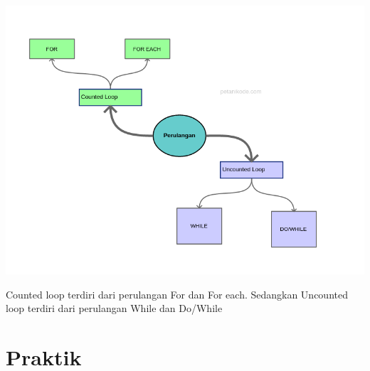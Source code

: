 \documentclass[a4paper,12pt]{article}
\begin{document}
\begin{center}
	\includegraphics[scale=.45]{mindmap}
\end{center}
Counted loop terdiri dari perulangan For dan For each. Sedangkan Uncounted loop terdiri dari perulangan While dan Do/While

\newpage

\section{Praktik}
\end{document}
